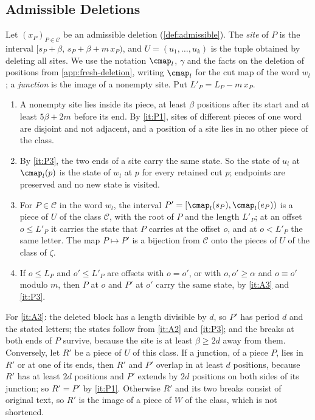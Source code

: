 \subsection{Admissible Deletions}\label{app:compression-admissible}

Let $(x_P)_{P\in\mathcal C}$ be an admissible deletion
(\cref{def:admissible}). The \emph{site} of $P$ is the interval
$[s_P+\beta,\,s_P+\beta+m\,x_P)$, and $U=(u_1,\dots,u_k)$ is the tuple
obtained by deleting all sites. We use the notation $\cmap_l$, $\gamma$ and
the facts on the deletion of positions from \cref{app:fresh-deletion},
writing $\cmap_l$ for the cut map of the word $w_l$; a \emph{junction} is
the image of a nonempty site. Put $L'_P=L_P-m\,x_P$.
\begin{enumerate}[label=\textup{(A\arabic*)}]
\item\label{it:A1} A nonempty site lies inside its piece, at least
  $\beta$ positions after its start and at least $5\beta+2m$ before its end.
  By \ref{it:P1}, sites of different pieces of one word are disjoint and not
  adjacent, and a position of a site lies in no other piece of the class.
\item\label{it:A2} By \ref{it:P3}, the two ends of a site carry the same
  state. So the state of $u_l$ at $\cmap_l(p)$ is the state of $w_l$ at $p$
  for every retained cut $p$; endpoints are preserved and no new state is
  visited.
\item\label{it:A3} For $P\in\mathcal C$ in the word $w_l$, the interval
  $P'=[\cmap_l(s_P),\cmap_l(e_P))$ is a piece of $U$ of the class
  $\mathcal C$, with the root of $P$ and the length $L'_P$; at an offset
  $o\le L'_P$ it carries the state that $P$ carries at the offset $o$, and
  at $o<L'_P$ the same letter. The map $P\mapsto P'$ is a bijection from
  $\mathcal C$ onto the pieces of $U$ of the class of $\zeta$.
\item\label{it:A4} If $o\le L_P$ and $o'\le L'_P$ are offsets with $o=o'$,
  or with $o,o'\ge\alpha$ and $o\equiv o'$ modulo $m$, then $P$ at $o$ and
  $P'$ at $o'$ carry the same state, by \ref{it:A3} and \ref{it:P3}.
\end{enumerate}
For \ref{it:A3}: the deleted block has a length divisible by $d$, so $P'$
has period $d$ and the stated letters; the states follow from \ref{it:A2}
and \ref{it:P3}; and the breaks at both ends of $P$ survive, because the
site is at least $\beta\ge2d$ away from them. Conversely, let $R'$ be a
piece of $U$ of this class. If a junction, of a piece $P$, lies in $R'$ or
at one of its ends, then $R'$ and $P'$ overlap in at least $d$ positions,
because $R'$ has at least $2d$ positions and $P'$ extends by $2d$ positions
on both sides of its junction; so $R'=P'$ by \ref{it:P1}. Otherwise $R'$ and
its two breaks consist of original text, so $R'$ is the image of a piece of
$W$ of the class, which is not shortened.

